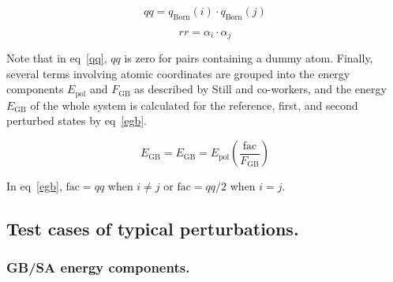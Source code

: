 \documentclass[12pt]{report}
\def\equlab{eq}\def\equslab{Eqs.}
\newcommand*\eq[1]{\equlab~\ref{#1}}
\begin{document}
\begin{equation}
\label{qq}
qq = q_{ \textrm{Born}}(i) \cdot q_{ \textrm{Born}}(j)
\end{equation}
\vspace*{-1.7cm}

\begin{equation}
\label{rr}
rr = \alpha_{i} \cdot \alpha_{j} 
\end{equation}
\vspace*{-0.8cm}

Note that in \eq{qq}, $qq$ is zero for pairs containing a dummy atom. Finally, several terms involving atomic coordinates are grouped into the energy components $E_{ \textrm{pol}}$ and $F_{ \textrm{GB}}$ as described by Still and co-workers,\cite{qiu} and the energy $E_{ \textrm{GB}}$ of the whole system is calculated for the reference, first, and second perturbed states by \eq{egb}.

\vspace*{-0.1cm}
\begin{equation}
\label{egb}
E_{\textrm{GB}} = E_{\textrm{GB}} = E_{\textrm{pol}} \left( \frac{\textrm{fac}}{F_{\textrm{GB}}} \right)
\end{equation}
\vspace*{-0.45cm}

In \eq{egb}, $\textrm{fac} = qq$ when $i \neq j$ or $\textrm{fac} = qq/2$ when $i = j$.


\subsection{Test cases of typical perturbations.}

\subsubsection{GB/SA energy components.}
\end{document}
